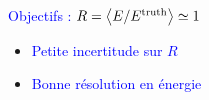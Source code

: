 \begin{frame}
\begin{columns}
\begin{column}{0.35\textwidth}
\end{column}
\end{columns}
\begin{center}
\begin{minipage}{4cm}
\begin{varblock}[5cm]{}
\begin{normalsize}
\textcolor{blue}{Objectifs : $R=\left<E/E^{\rm truth}\right>\simeq 1$}
\begin{itemize}
\item \textcolor{blue}{Petite incertitude sur $R$}
\item \textcolor{blue}{Bonne résolution en énergie}
\end{itemize}
\end{normalsize}
\end{varblock}
\end{minipage}
\end{center}
\end{frame}

